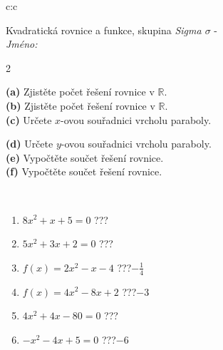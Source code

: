 \documentclass[10pt]{report}
\begin{document}
\begin{tabular}{c:c}
\begin{minipage}[c][104.5mm][t]{0.5\linewidth}
\begin{center}
\vspace{7mm}
{\huge \LARGE Kvadratická rovnice a funkce, skupina \textit{Sigma $\sigma$} -}\\[5mm]
\textit{Jméno:}\phantom{xxxxxxxxxxxxxxxxxxxxxxxxxxxxxxxxxxxxxxxxxxxxxxxxxxxxxxxxxxxxxxxxx}\\[5mm]
\begin{minipage}{0.95\linewidth}
\begin{center}
{\small \begin{multicols}{2} \raggedright
\textbf{(a)} Zjistěte počet řešení rovnice v \(\mathbb{R}\). \\[1mm]
\textbf{(b)} Zjistěte počet řešení rovnice v \(\mathbb{R}\). \\[1mm]
\textbf{(c)} Určete \(x\)-ovou souřadnici vrcholu paraboly. \par \columnbreak
\textbf{(d)} Určete \(y\)-ovou souřadnici vrcholu paraboly. \\[1mm]
\textbf{(e)} Vypočtěte součet řešení rovnice. \\[1mm]
\textbf{(f)} Vypočtěte součet řešení rovnice.
\end{multicols}
}
\end{center}
\end{minipage}
\\[4mm]
\begin{minipage}{0.79\linewidth}
\begin{center}
\begin{varwidth}{\linewidth}
\begin{enumerate}
\Large
\item $8x^2+x+5=0$\quad \dotfill\; ???\;\dotfill {}
\item $5x^2+3x+2=0$\quad \dotfill\; ???\;\dotfill {}
\item $f(x)=2x^2-x-4$\quad \dotfill\; ???\;\dotfill \quad $-\frac{1}{4}$
\item $f(x)=4x^2-8x+2$\quad \dotfill\; ???\;\dotfill \quad $-3$
\item $4x^2+4x-80=0$\quad \dotfill\; ???\;\dotfill {}
\item $-x^2-4x+5=0$\quad \dotfill\; ???\;\dotfill \quad $-6$
\end{enumerate}
\end{varwidth}
\end{center}
\end{minipage}

\end{center}
\end{minipage}
\end{tabular}
\end{document}
